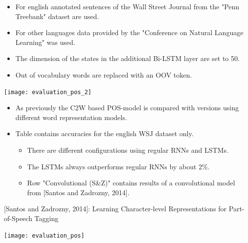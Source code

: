 \documentclass[11pt, a4paper, landscape]{article}
\begin{document}
\NewPage{}

\vfill
\begin{itemize}
\item For english annotated sentences of the Wall Street Journal from the "Penn Treebank" dataset are used.
\item For other languages data provided by the "Conference on Natural Language Learning" was used.
\item The dimension of the states in the additional Bi-LSTM layer are set to 50.
\item Out of vocabulary words are replaced with an OOV token.
\end{itemize}
\vfill

\NewPage{}

\begin{center}
    \texttt{[image: evaluation\_pos\_2]}\\
\end{center}

\vfill
\begin{itemize}
\item As previously the C2W based POS-model is compared with versions using different
      word representation models.
\item Table contains accuracies for the english WSJ dataset only.
  \begin{itemize}
  \item There are different configurations using regular RNNs and LSTMs.
  \item The LSTMs always outperforms regular RNNs by about 2\%.
  \item Row "Convolutional (S\&Z)" contains results of a convolutional model from [Santos and Zadrozny, 2014].
  \end{itemize}
\end{itemize}
\vfill
{\footnotesize [Santos and Zadrozny, 2014]: Learning Character-level Representations for Part-of-Speech Tagging}


\NewPage{}

\begin{center}
      \texttt{[image: evaluation\_pos]}
\end{center}
\end{document}
